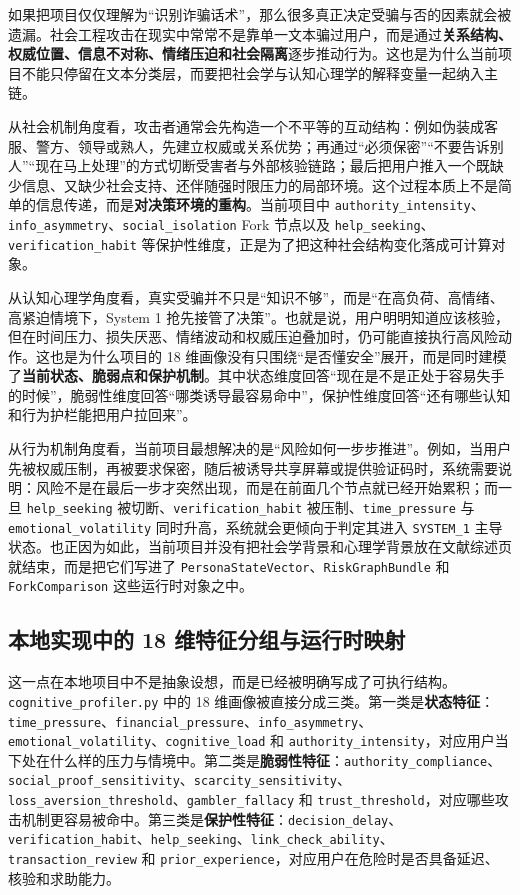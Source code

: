 \documentclass[12pt,a4paper]{ctexart}
\begin{document}
如果把项目仅仅理解为“识别诈骗话术”，那么很多真正决定受骗与否的因素就会被遗漏。社会工程攻击在现实中常常不是靠单一文本骗过用户，而是通过\textbf{关系结构、权威位置、信息不对称、情绪压迫和社会隔离}逐步推动行为。这也是为什么当前项目不能只停留在文本分类层，而要把社会学与认知心理学的解释变量一起纳入主链。

从社会机制角度看，攻击者通常会先构造一个不平等的互动结构：例如伪装成客服、警方、领导或熟人，先建立权威或关系优势；再通过“必须保密”“不要告诉别人”“现在马上处理”的方式切断受害者与外部核验链路；最后把用户推入一个既缺少信息、又缺少社会支持、还伴随强时限压力的局部环境。这个过程本质上不是简单的信息传递，而是\textbf{对决策环境的重构}。当前项目中 \texttt{authority\_intensity}、\texttt{info\_asymmetry}、\texttt{social\_isolation} Fork 节点以及 \texttt{help\_seeking}、\texttt{verification\_habit} 等保护性维度，正是为了把这种社会结构变化落成可计算对象。

从认知心理学角度看，真实受骗并不只是“知识不够”，而是“在高负荷、高情绪、高紧迫情境下，System 1 抢先接管了决策”。也就是说，用户明明知道应该核验，但在时间压力、损失厌恶、情绪波动和权威压迫叠加时，仍可能直接执行高风险动作。这也是为什么项目的 18 维画像没有只围绕“是否懂安全”展开，而是同时建模了\textbf{当前状态、脆弱点和保护机制}。其中状态维度回答“现在是不是正处于容易失手的时候”，脆弱性维度回答“哪类诱导最容易命中”，保护性维度回答“还有哪些认知和行为护栏能把用户拉回来”。

从行为机制角度看，当前项目最想解决的是“风险如何一步步推进”。例如，当用户先被权威压制，再被要求保密，随后被诱导共享屏幕或提供验证码时，系统需要说明：风险不是在最后一步才突然出现，而是在前面几个节点就已经开始累积；而一旦 \texttt{help\_seeking} 被切断、\texttt{verification\_habit} 被压制、\texttt{time\_pressure} 与 \texttt{emotional\_volatility} 同时升高，系统就会更倾向于判定其进入 \texttt{SYSTEM\_1} 主导状态。也正因为如此，当前项目并没有把社会学背景和心理学背景放在文献综述页就结束，而是把它们写进了 \texttt{PersonaStateVector}、\texttt{RiskGraphBundle} 和 \texttt{ForkComparison} 这些运行时对象之中。

\subsection{本地实现中的 18 维特征分组与运行时映射}

这一点在本地项目中不是抽象设想，而是已经被明确写成了可执行结构。\texttt{cognitive\_profiler.py} 中的 18 维画像被直接分成三类。第一类是\textbf{状态特征}：\texttt{time\_pressure}、\texttt{financial\_pressure}、\texttt{info\_asymmetry}、\texttt{emotional\_volatility}、\texttt{cognitive\_load} 和 \texttt{authority\_intensity}，对应用户当下处在什么样的压力与情境中。第二类是\textbf{脆弱性特征}：\texttt{authority\_compliance}、\texttt{social\_proof\_sensitivity}、\texttt{scarcity\_sensitivity}、\texttt{loss\_aversion\_threshold}、\texttt{gambler\_fallacy} 和 \texttt{trust\_threshold}，对应哪些攻击机制更容易被命中。第三类是\textbf{保护性特征}：\texttt{decision\_delay}、\texttt{verification\_habit}、\texttt{help\_seeking}、\texttt{link\_check\_ability}、\texttt{transaction\_review} 和 \texttt{prior\_experience}，对应用户在危险时是否具备延迟、核验和求助能力。
\end{document}

